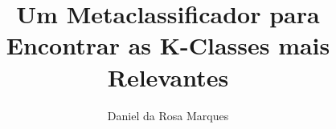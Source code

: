 \documentclass[
  msc
]{ThesisPUC}
\author{Daniel da Rosa Marques}
\title{Um Metaclassificador para Encontrar as K-Classes mais Relevantes}
\begin{document}
  
  
  
  
  
  

  \arial
  
\end{document}
